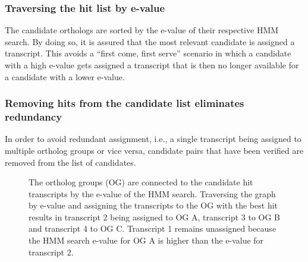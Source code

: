 \subsubsection{Traversing the hit list by e-value}

The candidate orthologs are sorted by the e-value of their respective HMM
search. By doing so, it is assured that the most relevant candidate is assigned
a transcript. This avoids a ``first come, first serve'' scenario in which a
candidate with a high e-value gets assigned a transcript that is then no longer
available for a candidate with a lower e-value.

\subsubsection{Removing hits from the candidate list eliminates redundancy}

In order to avoid redundant assignment, i.e., a single transcript being assigned
to multiple ortholog groups or vice versa, candidate pairs that have been
verified are removed from the list of candidates. 

\begin{figure}[ht]
	\def\svgwidth{0.8\textwidth}
	
	\caption[Non-redundant assignment]{The ortholog groups (OG) are connected to
		the candidate hit transcripts by the e-value of the HMM search. Traversing
		the graph by e-value and assigning the transcripts to the OG with the best
		hit results in transcript 2 being assigned to OG A, transcript 3 to OG B and
		transcript 4 to OG C. Transcript 1 remains unassigned because the HMM search
		e-value for OG A is higher than the e-value for transcript 2.}
	\label{fig:orthograph-graph}
\end{figure}
